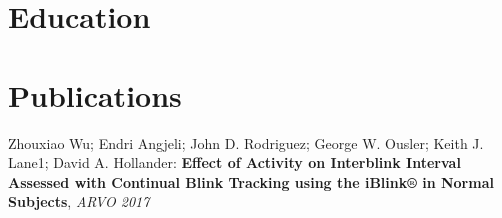 \documentclass[10pt,a4paper,merriweather]{moderncv}        %
\begin{document}

\section{Education}

\section{Publications}
\small Zhouxiao Wu; Endri Angjeli; John D. Rodriguez; George W. Ousler; Keith J. Lane1; David A. Hollander: \textbf{Effect of Activity on Interblink Interval Assessed with Continual Blink Tracking using the iBlink® in Normal Subjects}, \textit{ARVO 2017}

\clearpage





\end{document}
